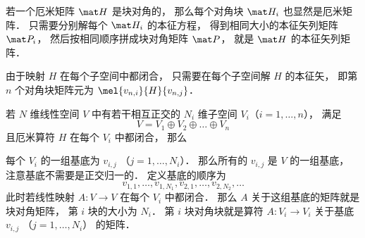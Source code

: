 

\begin{theorem}{}
若一个厄米矩阵 $\mat H$ 是块对角的， 那么每个对角块 $\mat H_i$ 也显然是厄米矩阵． 只需要分别解每个 $\mat H_i$ 的本征方程， 得到相同大小的本征矢列矩阵 $\mat P_i$， 然后按相同顺序拼成块对角矩阵 $\mat P$， 就是 $\mat H$ 的本征矢列矩阵．
\end{theorem}


由于映射 $H$ 在每个子空间中都闭合， 只需要在每个子空间解 $H$ 的本征矢， 即第 $n$ 个对角块矩阵元为 $\mel{v_{n,i}}{H}{v_{n,j}}$．

\begin{theorem}{}
若 $N$ 维线性空间 $V$ 中有若干相互正交的 $N_i$ 维子空间 $V_i$（$i=1,\dots,n$）， 满足
\begin{equation}
V = V_1 \oplus V_2 \oplus \dots \oplus V_n
\end{equation}
且厄米算符 $H$ 在每个 $V_i$ 中都闭合， 那么

每个 $V_i$ 的一组基底为 $v_{i,j}$ （$j=1,\dots,N_i$）． 那么所有的 $v_{i,j}$ 是 $V$ 的一组基底， 注意基底不需要是正交归一的． 定义基底的顺序为
\begin{equation}
v_{1,1},\dots, v_{1,N_1}, v_{2,1}, \dots, v_{2,N_2}, \dots
\end{equation}
此时若线性映射 $A: V\to V$ 在每个 $V_i$ 中都闭合． 那么 $A$ 关于这组基底的矩阵就是块对角矩阵， 第 $i$ 块的大小为 $N_i$． 第 $i$ 块对角块就是算符 $A:V_i\to V_i$ 关于基底 $v_{i,j}$ （$j=1,\dots,N_i$） 的矩阵．
\end{theorem}
